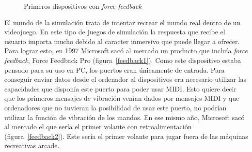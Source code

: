 \begin{figure}[t]
     \hfill
{}
     \caption{Primeros dispositivos con \textit{force feedback}}
     \label{fig:feedback}
   \end{figure}

El mundo de la simulaci\'on trata de intentar recrear el mundo real dentro de un videojuego. En este tipo de juegos de simulaci\'on la respuesta que recibe el usuario importa mucho debido al caracter inmersivo que puede llegar a ofrecer. Para lograr esto, en 1997 Microsoft sac\'o al mercado un producto que inclu\'ia \textit{force feedback}, Force Feedback Pro (figura~\ref{feedback1}). Como este dispositivo estaba pensado para su uso en PC, los puertos eran \'unicamente de entrada. Para conseguir enviar datos desde el ordenador al dispositivos era necesario utilizar las capacidades que dispon\'ia este puerto para poder usar MIDI. Esto quiere decir que los primeros mensajes de vibraci\'on ven\'ian dados por mensajes MIDI y que ordenadores que no tuvieran la posibilidad de usar este puerto, no podr\'ian utilizar la funci\'on de vibraci\'on de los mandos. En ese mismo a\~no, Microsoft sac\'o al mercado el que ser\'ia el primer volante con retroalimentaci\'on (figura~\ref{feedback2}). Este ser\'ia el primer volante para jugar fuera de las m\'aquinas recreativas arcade.\\



